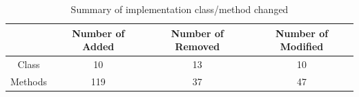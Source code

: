 \documentclass[12pt]{article}
\begin{document}
    \begin{table}[h!]
        \centering
        \caption{Summary of implementation class/method changed}
        \label{tab:modifyToClass}
        \begin{tabular}{c c c c}
            \hline
            & \textbf{Number of Added} & \textbf{Number of Removed} & \textbf{Number of Modified} \\
            \hline
            Class   & 10                       & 13                         & 10                          \\
            \hline
            Methods & 119                      & 37                         & 47                          \\
        \end{tabular}
    \end{table}
\end{document}
